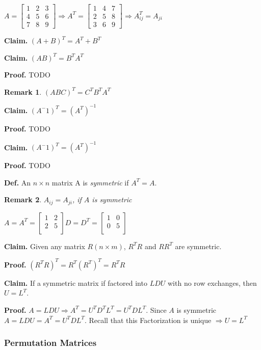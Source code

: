 \documentclass[12pt,a4paper]{article}
\newtheorem*{rem}{Remark}
\newcommand{\Remark}[1]{
  \begin{rem}
    \color{cyan}
    #1
  \end{rem}
}
\begin{document}
$
A = 
\begin{bmatrix}
  1 & 2 & 3 \\
  4 & 5 & 6 \\
  7 & 8 & 9
\end{bmatrix}
\Rightarrow
A^T =
\begin{bmatrix}
  1 & 4 & 7 \\
  2 & 5 & 8 \\
  3 & 6 & 9
\end{bmatrix}
\Rightarrow
A^T_{ij} = A_{ji}
$

\textbf{Claim.} $(A+B)^T = A^T + B^T$

\textbf{Claim.} $(AB)^T = B^TA^T$

\textbf{Proof.} TODO

\Remark{$(ABC)^T = C^TB^TA^T$}

\textbf{Claim.} $(A^-1)^T = (A^T)^{-1}$

\textbf{Proof.} TODO

\textbf{Claim.} $(A^-1)^T = (A^T)^{-1}$

\textbf{Proof.} TODO

\textbf{Def.} An $n \times n$ matrix A is \textit{symmetric} if $A^T = A$.

\Remark{$A_{ij} = A_{ji}$, if $A$ is symmetric}

$
A = A^T = 
\begin{bmatrix}
  1 & 2 \\
  2 & 5 \\
\end{bmatrix}
D = D^T = 
\begin{bmatrix}
  1 & 0 \\
  0 & 5 \\
\end{bmatrix}
$

\textbf{Claim.} Given any matrix $R(n\times m)$, $R^TR$ and $RR^T$ are symmetric.

\textbf{Proof.} $(R^TR)^T = R^T(R^T)^T = R^TR$

\textbf{Claim.} If a symmetric matrix if factored into $LDU$ with no row exchanges, then $U = L^T$.

\textbf{Proof.} $A = LDU \Rightarrow A^T = U^TD^TL^T = U^TDL^T$. 
Since $A$ is symmetric $A = LDU = A^T = U^TDL^T$. Recall that this Factorization is unique $\Rightarrow U = L^T$

\subsubsection*{Permutation Matrices}
\end{document}
